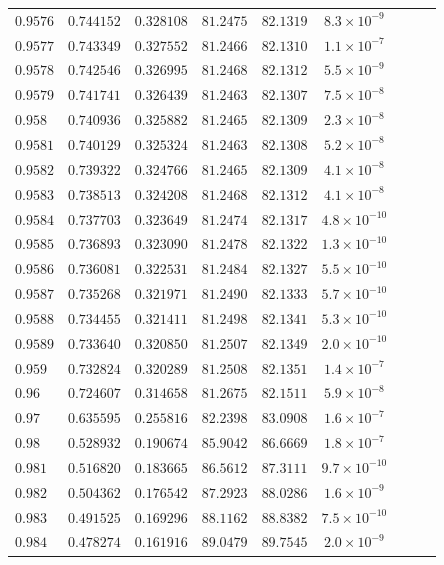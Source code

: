 \documentclass[12pt]{extarticle}
\theoremstyle{plain}
\theoremstyle{remark}
\begin{document}
\begin{longtable}{lcccccccc}
$0.9576$ & $0.744152$ & $0.328108$ & $81.2475$ & $82.1319$ & $8.3\times10^{-9}$ \\
$0.9577$ & $0.743349$ & $0.327552$ & $81.2466$ & $82.1310$ & $1.1\times10^{-7}$ \\
$0.9578$ & $0.742546$ & $0.326995$ & $81.2468$ & $82.1312$ & $5.5\times10^{-9}$ \\
$0.9579$ & $0.741741$ & $0.326439$ & $81.2463$ & $82.1307$ & $7.5\times10^{-8}$ \\
$0.958$ & $0.740936$ & $0.325882$ & $81.2465$ & $82.1309$ & $2.3\times10^{-8}$ \\
$0.9581$ & $0.740129$ & $0.325324$ & $81.2463$ & $82.1308$ & $5.2\times10^{-8}$ \\
$0.9582$ & $0.739322$ & $0.324766$ & $81.2465$ & $82.1309$ & $4.1\times10^{-8}$ \\
$0.9583$ & $0.738513$ & $0.324208$ & $81.2468$ & $82.1312$ & $4.1\times10^{-8}$ \\
$0.9584$ & $0.737703$ & $0.323649$ & $81.2474$ & $82.1317$ & $4.8\times10^{-10}$ \\
$0.9585$ & $0.736893$ & $0.323090$ & $81.2478$ & $82.1322$ & $1.3\times10^{-10}$ \\
$0.9586$ & $0.736081$ & $0.322531$ & $81.2484$ & $82.1327$ & $5.5\times10^{-10}$ \\
$0.9587$ & $0.735268$ & $0.321971$ & $81.2490$ & $82.1333$ & $5.7\times10^{-10}$ \\
$0.9588$ & $0.734455$ & $0.321411$ & $81.2498$ & $82.1341$ & $5.3\times10^{-10}$ \\
$0.9589$ & $0.733640$ & $0.320850$ & $81.2507$ & $82.1349$ & $2.0\times10^{-10}$ \\
$0.959$ & $0.732824$ & $0.320289$ & $81.2508$ & $82.1351$ & $1.4\times10^{-7}$ \\
$0.96$ & $0.724607$ & $0.314658$ & $81.2675$ & $82.1511$ & $5.9\times10^{-8}$ \\
$0.97$ & $0.635595$ & $0.255816$ & $82.2398$ & $83.0908$ & $1.6\times10^{-7}$ \\
$0.98$ & $0.528932$ & $0.190674$ & $85.9042$ & $86.6669$ & $1.8\times10^{-7}$ \\
$0.981$ & $0.516820$ & $0.183665$ & $86.5612$ & $87.3111$ & $9.7\times10^{-10}$ \\
$0.982$ & $0.504362$ & $0.176542$ & $87.2923$ & $88.0286$ & $1.6\times10^{-9}$ \\
$0.983$ & $0.491525$ & $0.169296$ & $88.1162$ & $88.8382$ & $7.5\times10^{-10}$ \\
$0.984$ & $0.478274$ & $0.161916$ & $89.0479$ & $89.7545$ & $2.0\times10^{-9}$ \\

\end{longtable}
\end{document}

